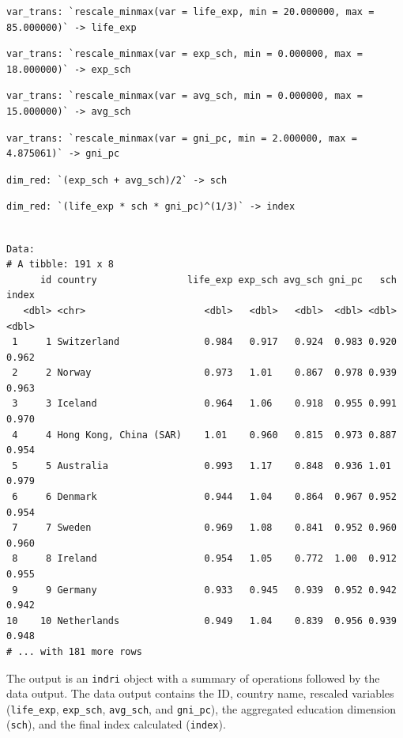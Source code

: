 \documentclass[
]{article}
\begin{document}
\begin{verbatim}
var_trans: `rescale_minmax(var = life_exp, min = 20.000000, max = 85.000000)` -> life_exp
\end{verbatim}

\begin{verbatim}
var_trans: `rescale_minmax(var = exp_sch, min = 0.000000, max = 18.000000)` -> exp_sch
\end{verbatim}

\begin{verbatim}
var_trans: `rescale_minmax(var = avg_sch, min = 0.000000, max = 15.000000)` -> avg_sch
\end{verbatim}

\begin{verbatim}
var_trans: `rescale_minmax(var = gni_pc, min = 2.000000, max = 4.875061)` -> gni_pc
\end{verbatim}

\begin{verbatim}
dim_red: `(exp_sch + avg_sch)/2` -> sch
\end{verbatim}

\begin{verbatim}
dim_red: `(life_exp * sch * gni_pc)^(1/3)` -> index
\end{verbatim}

\begin{verbatim}

Data: 
# A tibble: 191 x 8
      id country                life_exp exp_sch avg_sch gni_pc   sch index
   <dbl> <chr>                     <dbl>   <dbl>   <dbl>  <dbl> <dbl> <dbl>
 1     1 Switzerland               0.984   0.917   0.924  0.983 0.920 0.962
 2     2 Norway                    0.973   1.01    0.867  0.978 0.939 0.963
 3     3 Iceland                   0.964   1.06    0.918  0.955 0.991 0.970
 4     4 Hong Kong, China (SAR)    1.01    0.960   0.815  0.973 0.887 0.954
 5     5 Australia                 0.993   1.17    0.848  0.936 1.01  0.979
 6     6 Denmark                   0.944   1.04    0.864  0.967 0.952 0.954
 7     7 Sweden                    0.969   1.08    0.841  0.952 0.960 0.960
 8     8 Ireland                   0.954   1.05    0.772  1.00  0.912 0.955
 9     9 Germany                   0.933   0.945   0.939  0.952 0.942 0.942
10    10 Netherlands               0.949   1.04    0.839  0.956 0.939 0.948
# ... with 181 more rows
\end{verbatim}

The output is an \texttt{indri} object with a summary of operations
followed by the data output. The data output contains the ID, country
name, rescaled variables (\texttt{life\_exp}, \texttt{exp\_sch},
\texttt{avg\_sch}, and \texttt{gni\_pc}), the aggregated education
dimension (\texttt{sch}), and the final index calculated
(\texttt{index}).
\end{document}
